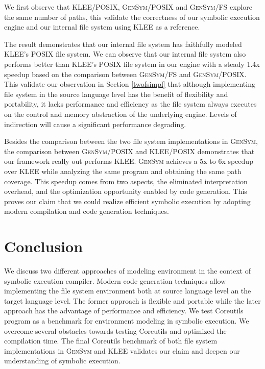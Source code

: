 \documentclass[sigplan, nonacm]{acmart}\settopmatter{printfolios=true,printccs=false,printacmref=false}
\newcommand{\tool}{\textsc{GenSym}\xspace}
\begin{document}
We first observe that KLEE/POSIX, \tool/POSIX and \tool/FS explore the same number of paths, this validate the correctness of our symbolic execution engine and our internal file system using KLEE as a reference. \par
The result demonstrates that our internal file system has faithfully modeled KLEE's POSIX file system. We can observe that our internal file system also performs better than KLEE's POSIX file system in our engine with a steady 1.4x speedup based on the comparison between \tool/FS and \tool/POSIX. This validate our observation in Section \ref{twofsimpl} that although implementing file system in the source language level has the benefit of flexibility and portability, it lacks performance and efficiency as the file system always executes on the control and memory abstraction of the underlying engine. Levels of indirection will cause a significant performance degrading.\par
Besides the comparison between the two file system implementations in \tool, the comparison between \tool/POSIX and KLEE/POSIX demonstrates that our framework really out performs KLEE. \tool achieves a 5x to 6x speedup over KLEE while analyzing the same program and obtaining the same path coverage. This speedup comes from two aspects, the eliminated interpretation overhead, and the optimization opportunity enabled by code generation. This proves our claim that we could realize efficient symbolic execution by adopting modern compilation and code generation techniques.
\section{Conclusion}\label{conclusion}
We discuss two different approaches of modeling environment in the context of symbolic execution compiler. Modern code generation techniques allow implementing the file system environment both at source language level an the target language level. The former approach is flexible and portable while the later approach has the advantage of performance and efficiency. We test Coreutils program as a benchmark for environment modeling in symbolic execution. We overcome several obstacles towards testing Coreutils and optimized the compilation time. The final Coreutils benchmark of both file system implementations in \tool and KLEE validates our claim and deepen our understanding of symbolic execution.


\end{document}

